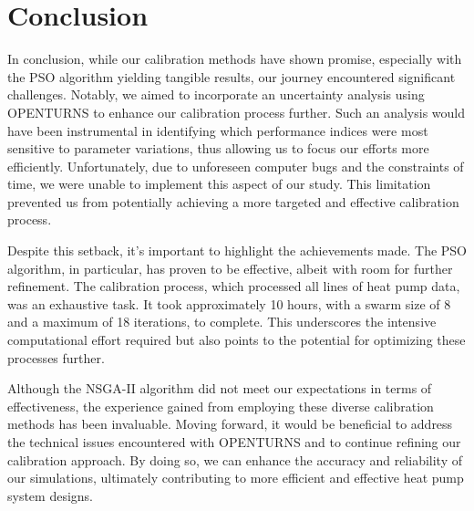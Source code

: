 \documentclass{report}
\begin{document}
\section{Conclusion}

In conclusion, while our calibration methods have shown promise, especially with the PSO algorithm yielding tangible results, our journey encountered significant challenges. Notably, we aimed to incorporate an uncertainty analysis using OPENTURNS to enhance our calibration process further. Such an analysis would have been instrumental in identifying which performance indices were most sensitive to parameter variations, thus allowing us to focus our efforts more efficiently. Unfortunately, due to unforeseen computer bugs and the constraints of time, we were unable to implement this aspect of our study. This limitation prevented us from potentially achieving a more targeted and effective calibration process.

Despite this setback, it's important to highlight the achievements made. The PSO algorithm, in particular, has proven to be effective, albeit with room for further refinement. The calibration process, which processed all lines of heat pump data, was an exhaustive task. It took approximately 10 hours, with a swarm size of 8 and a maximum of 18 iterations, to complete. This underscores the intensive computational effort required but also points to the potential for optimizing these processes further.

Although the NSGA-II algorithm did not meet our expectations in terms of effectiveness, the experience gained from employing these diverse calibration methods has been invaluable. Moving forward, it would be beneficial to address the technical issues encountered with OPENTURNS and to continue refining our calibration approach. By doing so, we can enhance the accuracy and reliability of our simulations, ultimately contributing to more efficient and effective heat pump system designs.

\printbibliography
\end{document}
